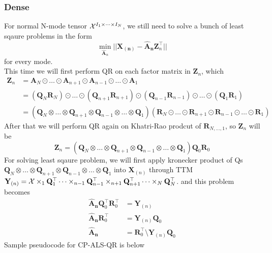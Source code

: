 \documentclass{article}
\newcommand{\mat}[1]{\mathbf{#1}}
\newcommand{\T}[2][]{#1{\mathbf{\cal{#2}}}} 						%
\begin{document}
\subsubsection*{Dense}
For normal N-mode tensor $\T{X}^{I_1 \times \dots \times I_N}$, we still need to solve a bunch of least sqaure problems in the form
$$\min_{\mat{\hat{A}}_n}||\mat{X_{(n)}} - {\mat{\hat{A}_n}}\mat{Z}^\top_n ||$$
for every mode.\\
This time we will first perform QR on each factor matrix in $\mat{Z}_n$, which 
\begin{align}
  \mat{Z}_n &= \mat{A}_N \odot \dots \odot \mat{A}_{n+1} \odot \mat{A}_{n-1} \odot \dots \odot \mat{A}_1 \nonumber \\
  &= (\mat{Q}_N\mat{R}_N) \odot \dots \odot (\mat{Q}_{n+1}\mat{R}_{n+1}) \odot (\mat{Q}_{n-1}\mat{R}_{n-1}) \odot \dots \odot (\mat{Q}_1\mat{R}_1) \nonumber \\
  &= (\mat{Q}_N \otimes \dots \otimes \mat{Q}_{n+1} \otimes \mat{Q}_{n-1} \otimes \dots \otimes \mat{Q}_1)(\mat{R}_N \odot \dots \odot \mat{R}_{n+1} \odot \mat{R}_{n-1} \odot \dots \odot \mat{R}_1)\nonumber  
\end{align}
After that we will perform QR again on Khatri-Rao prodcut of $\mat{R}_{N,\dots,1}$, so $\mat{Z}_n$ will be
$$\mat{Z}_n = (\mat{Q}_N \otimes \dots \otimes \mat{Q}_{n+1} \otimes \mat{Q}_{n-1} \otimes \dots \otimes \mat{Q}_1)\mat{Q}_0\mat{R}_0$$
For solving least sqaure problem, we will first apply kronecker product of Qs 
$\mat{Q}_N \otimes \dots \otimes \mat{Q}_{n+1} \otimes \mat{Q}_{n-1} \otimes \dots \otimes \mat{Q}_1$ into $\mat{X}_{(n)}$ through TTM 
$\mat{Y}_{(n)} =  \T{X} \times_1 \mat{Q}_1^\top \dots \times_{n-1} \mat{Q}_{n-1}^\top \times_{n+1} \mat{Q}_{n+1}^\top \dots \times_N \mat{Q}_N^\top$.
and this problem becomes
\begin{align}
  \mat{\hat{A}_n}\mat{Q}_0^\top \mat{R}_0^\top &= \mat{Y}_{(n)} \nonumber \\
  \mat{\hat{A}_n}\mat{R}_0^\top &= \mat{Y}_{(n)} \mat{Q}_0 \nonumber \\
  \mat{\hat{A}_n} &= \mat{R}_0^\top \text{\textbackslash} \mat{Y}_{(n)} \mat{Q}_0 \nonumber
\end{align}
Sample pseudocode for CP-ALS-QR is below
\end{document}
